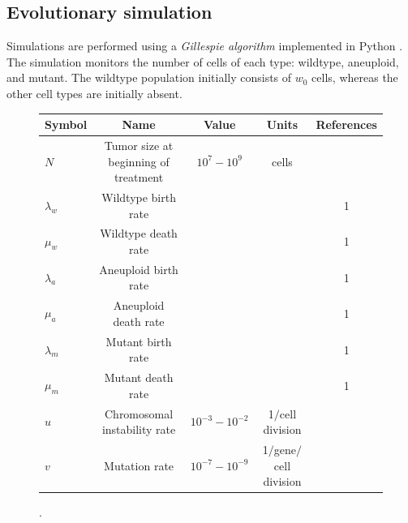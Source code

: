 \documentclass[12pt]{extarticle}
\begin{document}
\subsection*{Evolutionary simulation} 
Simulations are performed using a \emph{Gillespie algorithm} \cite{gillespie1976general,gillespie1977exact} implemented in Python \cite{python}.
The simulation monitors the number of cells of each type: wildtype, aneuploid, and mutant. 
The wildtype population initially consists of $w_0$ cells, whereas the other cell types are initially absent.
\begin{figure}
\begin{center}
  \begin{tabular}{| l |c| c | c | c |}
    \hline
    Symbol & Name & Value & Units & References \\ \hline
    $N$ & Tumor size at beginning of treatment& $10^7-10^9$ & cells  & \cite{del2009does} \\ \hline
    $\lambda_w$ & Wildtype birth rate&  &   & 1 \\ \hline
    $\mu_w$ & Wildtype death rate&  &   & 1 \\ \hline
    $\lambda_a$ & Aneuploid birth rate&  &   & 1 \\ \hline
    $\mu_a$ & Aneuploid death rate&  &   & 1 \\ \hline
    $\lambda_m$ & Mutant birth rate&  &   & 1 \\ \hline
    $\mu_m$ & Mutant death rate&  &   & 1 \\ \hline
    $u$ & Chromosomal instability rate& $10^{-3}-10^{-2}$ & 1$\slash$cell division  & \cite{nowak2004evolutionary,bakker2023predicting} \\ \hline
    $v$ & Mutation rate& $10^{-7}-10^{-9}$ &  1$\slash$gene$\slash$cell division  & \cite{nowak2004evolutionary} \\ \hline
  \end{tabular}
\caption{.}
  \label{t1}
\end{center}
\end{figure}
\end{document}
